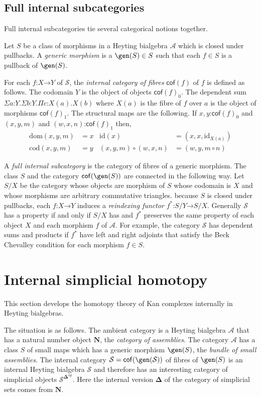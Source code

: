 \documentclass{amsart}
\theoremstyle{plain}
\theoremstyle{definition}
\newcommand\cat\mathcal
\newcommand\id{\mathrm{id}}
\newcommand\dom{\mathrm{dom}}
\newcommand\cod{\mathrm{cod}}
\newcommand\ri{^*}
\newcommand\nno{\mathbf N}
\newcommand\dual{^{\mathrm{op}}}
\newcommand\simCat{\mathbf\Delta}
\newcommand\s{^{\simCat\dual}}
\newcommand\of{\mathord:}
\renewcommand\to{\mathord\rightarrow}
\begin{document}
\subsection{Full internal subcategories}\label{full internal subcategory}
Full internal subcategories tie several categorical notions together. 

Let $S$ be a class of morphisms in a Heyting bialgebra $\cat A$ which is closed under pullbacks. A \emph{generic morphism} is a $\gen(S)\in S$ such that each $f\in S$ is a pullback of $\gen(S)$.

\newcommand\cof{\mathsf{cof}}
For each $f\of X\to Y$ of $\cat S$, the \emph{internal category of fibres} $\cof(f)$ of $f$ is defined as follows. The codomain $Y$ is the object of objects $\cof(f)_0$. The dependent sum $\Sigma a\of Y.\Sigma b\of Y.\Pi c\of X(a).X(b)$ where $X(a)$ is the fibre of $f$ over $a$ is the object of morphisms $\cof(f)_1$. The structural maps are the following. If $x,y\of \cof(f)_0$ and $(x,y,m)$ and $(w,x,n)\of\cof(f)_1$ then,
\begin{align*}
\dom(x,y,m) &= x & 
\id(x) &= (x,x,\id_{X(a)})\\
\cod(x,y,m) &= y &
(x,y,m)\circ (w,x,n) &= (w,y,m\circ n)
\end{align*}\label{category of fibres}

A \emph{full internal subcategory} is the category of fibres of a generic morphism. The class $S$ and the category $\cof(\gen(S))$ are connected in the following way. Let $S/X$ be the category whose objects are morphism of $S$ whose codomain is $X$ and whose morphisms are arbitrary commutative triangles. because $S$ is closed under pullbacks, each $f\of X\to Y$ induces a \emph{reindexing functor} $f\ri\of S/Y\to S/X$. Generally $\cat S$ has a property if and only if $S/X$ has and $f\ri$ preserves the same property of each object $X$ and each morphism $f$ of $\cat A$. For example, the category $\cat S$ has dependent sums and products if $f\ri$ have left and right adjoints that satisfy the Beck Chevalley condition for each morphism $f\in S$.

\section{Internal simplicial homotopy}
This section develops the homotopy theory of Kan complexes internally in Heyting bialgebras.

The situation is as follows. The ambient category is a Heyting bialgebra $\cat A$ that has a natural number object $\nno$, the \emph{category of assemblies}. The category $\cat A$ has a class $S$ of small maps which has a generic morphism $\gen(S)$, the \emph{bundle of small assemblies}. The internal category $\cat S = \cof(\gen(\cat S))$ of fibres of $\gen(S)$ is an internal Heyting bialgebra $\cat S$ and therefore has an interesting category of simplicial objects $\cat S\s$. Here the internal version $\simCat$ of the category of simplicial sets comes from $\nno$.
\end{document}
